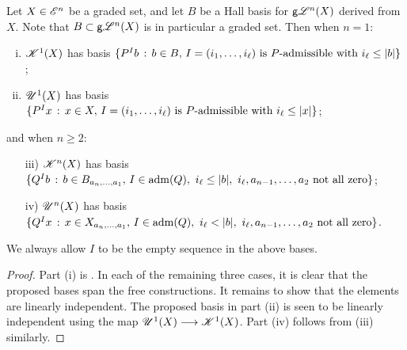 \documentclass[11pt]{article}
\newcommand{\GS}[1]{\scrE^{#1}}
\newcommand{\GoodLie}[1]{\mathsf{g}{\scrL}^{#1}}%
\newcommand{\LL}[1]{{\scrK}^{#1}}%
\newcommand{\nontop}[1]{\scrU^{#1}}%
\newcommand{\admis}[1]{\mathrm{adm}(#1)}%
\newcommand{\Fr}[1]{#1}%
\newcommand{\LambdaOp}{Q}
\begin{document}
\begin{CategoriesOfInterest}
\begin{prop*}
Let $X\in\GS{n}$ be a graded set, and let $B$ be a Hall basis for $\Fr{\GoodLie{n}}(X)$ derived from $X$. Note that $B\subset \Fr{\GoodLie{n}}(X)$ is in particular a graded set. Then when $n=1$:
\begin{enumerate}[i)]\squishlist
\setlength{\parindent}{.25in}
\item $\Fr{\LL{1}}(X)$ has basis $\{P^Ib\,:\,b\in B,\,I=(i_1,\ldots,i_\ell)\textup{ is $P$-admissible with }i_\ell\leq|b| \}$;
\item $\Fr{\nontop{1}}(X)$ has basis $\{P^Ix\,:\,x\in X,\,I=(i_1,\ldots,i_\ell)\textup{ is $P$-admissible with }i_\ell\leq|x| \}$;
\end{enumerate}
and when $n\geq2$:
\begin{enumerate}[i)]\squishlist
\setlength{\parindent}{.25in}
\item[iii)] $\Fr{\LL{n}}(X)$ has basis $\{\LambdaOp^Ib\,:\,b\in B_{a_{n},\ldots,a_1},\,I\in\admis{\LambdaOp},\ i_\ell\leq|b|,\ i_\ell,a_{n-1},\ldots,a_2\textup{ not all zero}\}$;
\item[iv)] $\Fr{\nontop{n}}(X)$ has basis $\{\LambdaOp^Ix\,:\,x\in X_{a_{n},\ldots,a_1},\,I\in\admis{\LambdaOp},\ i_\ell<|b|,\ i_\ell,a_{n-1},\ldots,a_2\textup{ not all zero}\}$.
\end{enumerate}
We always allow $I$ to be the empty sequence in the above bases.
\end{prop*}
%
\begin{proof}
Part (i) is \cite[Thm F, p.15]{MR1089001}.
In each of the remaining three cases, it is clear that the proposed bases span the free constructions. It remains to show that the elements are linearly independent.
The proposed basis in part (ii) is seen to be linearly independent using the map $\Fr{\nontop{1}}(X)\to \Fr{\LL{1}}(X)$. Part (iv) follows from (iii) similarly.


\end{proof}
\end{CategoriesOfInterest}
\end{document}
